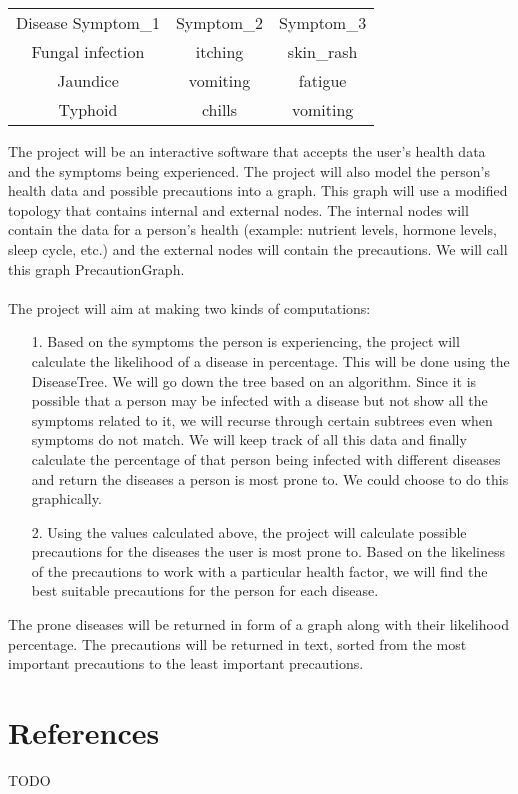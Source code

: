 \documentclass[fontsize=11pt]{article}
\begin{document}
\begin{center}
\begin{tabular}{ |c|c|c| } 
 \hline
Disease	Symptom\_1 & Symptom\_2 & Symptom\_3 \\ 
Fungal infection & itching & skin\_rash \\ 
Jaundice & vomiting & fatigue \\ 
Typhoid	& chills & vomiting \\
 \hline
\end{tabular}
\end{center}

The project will be an interactive software that accepts the user’s health data and the symptoms being experienced. The project will also model the person’s health data and possible precautions into a graph. This graph will use a modified topology that contains internal and external nodes.  The internal nodes will contain the data for a person’s health (example: nutrient levels, hormone levels, sleep cycle, etc.) and the external nodes will contain the precautions. We will call this graph PrecautionGraph. \\
\\
The project will aim at making two kinds of computations:

\begin{enumerate}
\item[1.] Based on the symptoms the person is experiencing, the project will calculate the likelihood of a disease in percentage. This will be done using the DiseaseTree. We will go down the tree based on an algorithm. Since it is possible that a person may be infected with a disease but not show all the symptoms related to it, we will recurse through certain subtrees even when symptoms do not match. We will keep track of all this data and finally calculate the percentage of that person being infected with different diseases and return the diseases a person is most prone to. We could choose to do this graphically.

\item[2.] Using the values calculated above, the project will calculate possible precautions for the diseases the user is most prone to. Based on the likeliness of the precautions to work with a particular health factor, we will find the best suitable precautions for the person for each disease.
\end{enumerate}

The prone diseases will be returned in form of a graph along with their likelihood percentage. The precautions will be returned in text, sorted from the most important precautions to the least important precautions.


\section*{References}

TODO

\end{document}
